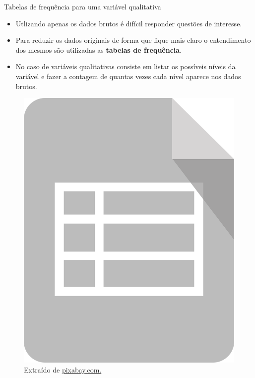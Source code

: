 \documentclass[
  ignorenonframetext,
  serif,
  professionalfont,
  usenames,
  dvipsnames,
  aspectratio = 169]{beamer}
\providecommand{\tightlist}{%
  \setlength{\itemsep}{0pt}\setlength{\parskip}{0pt}}
\renewcommand{\tightlist}{%
  \setlength{\itemsep}{0\baselineskip}
  \setlength{\parskip}{0.25\baselineskip}
}
\def\beginAHalfColumn{\begin{minipage}{0.49\textwidth}}%
\def\endColumns{\end{minipage}}%
\begin{document}
\begin{frame}{Tabelas de frequência para uma variável qualitativa}
\label{tabelas-de-frequuxeancia-para-uma-variuxe1vel-qualitativa}
\beginAHalfColumn

\begin{itemize}
\tightlist
\item
  Utlizando apenas os dados brutos é difícil responder questões de
  interesse.
\end{itemize}

\vspace{0.3cm}

\begin{itemize}
\tightlist
\item
  Para reduzir os dados originais de forma que fique mais claro o
  entendimento dos mesmos são utilizadas as
  \textbf{tabelas de frequência}.
\end{itemize}

\vspace{0.3cm}

\begin{itemize}
\tightlist
\item
  No caso de variáveis qualitativas consiste em listar os possíveis
  níveis da variável e fazer a contagem de quantas vezes cada nível
  aparece nos dados brutos.
\end{itemize}

\endColumns
\beginAHalfColumn

\begin{figure}

{\centering \includegraphics[width=0.4\linewidth]{./img/tabela} 

}

\caption{Extraído de \href{https://cdn.pixabay.com/photo/2016/12/11/01/28/spreadsheet-icon-1898557_1280.png}{pixabay.com.}}\label{fig:unnamed-chunk-34}
\end{figure}

\endColumns
\end{frame}
\end{document}
